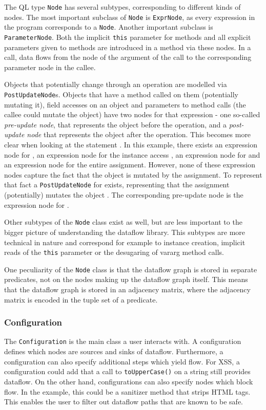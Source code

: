 The QL type \texttt{Node} has several subtypes, corresponding to different kinds of nodes.
The most important subclass of \texttt{Node} is \texttt{ExprNode}, 
as every expression in the program corresponds to a \texttt{Node}.
Another important subclass is \texttt{ParameterNode}.
Both the implicit \texttt{this} parameter for methods and all explicit parameters
given to methods are introduced in a method via these nodes.
In a call, data flows from the node of the argument of the 
call to the corresponding parameter node in the callee.

Objects that potentially change through an operation are modelled
 via \texttt{PostUpdateNode}s.
Objects that have a method called on them (potentially mutating it),
field accesses on an object and parameters to method calls (the callee could mutate the object)
have two nodes for that expression - one so-called \emph{pre-update node}, that represents 
the object before the operation, and a \emph{post-update node} that represents 
the object after the operation.
This becomes more clear when looking at the statement .
In this example, there exists an expression node for 
, an expression node for the instance access ,
an expression node for  and an expression node for the entire assignment.
However, none of these expression nodes capture the fact that the object 
is mutated by the assignment.
To represent that fact a \texttt{PostUpdateNode} for  exists,
representing that the assignment (potentially) mutates the object .
The corresponding pre-update node is the expression node for .

Other subtypes of the \texttt{Node} class exist as well, 
but are less important to the bigger picture of understanding the dataflow library.
This subtypes are more technical in nature and correspond for example 
to instance creation, implicit reads of the \texttt{this} parameter or
the desugaring of vararg method calls.

One peculiarity of the \texttt{Node} class is that the dataflow graph
is stored in separate predicates, not on the nodes making up the dataflow
 graph itself.
This means that the dataflow graph is stored in an adjacency matrix, where the
adjacency matrix is encoded in the tuple set of a predicate.

\subsubsection*{Configuration}
The \texttt{Configuration} is the main class a user interacts with.
A configuration defines which nodes are sources and sinks of dataflow.
Furthermore, a configuration can also specify additional steps which yield flow.
For XSS, a configuration could add that a call to 
\texttt{toUpperCase()} on a string still provides dataflow.
On the other hand, configurations can also specify nodes which block flow.
In the example, this could be a sanitizer method that strips HTML tags.
This enables the user to filter out dataflow paths that are known to be safe.

